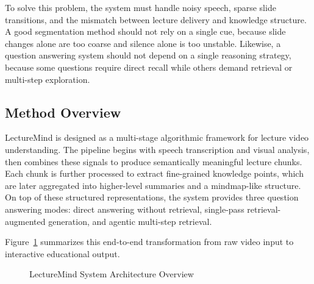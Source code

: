 To solve this problem, the system must handle noisy speech, sparse slide transitions, and the mismatch between lecture delivery and knowledge structure. A good segmentation method should not rely on a single cue, because slide changes alone are too coarse and silence alone is too unstable. Likewise, a question answering system should not depend on a single reasoning strategy, because some questions require direct recall while others demand retrieval or multi-step exploration.

\subsection{Method Overview}

LectureMind is designed as a multi-stage algorithmic framework for lecture video understanding. The pipeline begins with speech transcription and visual analysis, then combines these signals to produce semantically meaningful lecture chunks. Each chunk is further processed to extract fine-grained knowledge points, which are later aggregated into higher-level summaries and a mindmap-like structure. On top of these structured representations, the system provides three question answering modes: direct answering without retrieval, single-pass retrieval-augmented generation, and agentic multi-step retrieval.

Figure~\ref{fig:system-overview} summarizes this end-to-end transformation from raw video input to interactive educational output.

\begin{figure}[H]
    \centering
    \caption{LectureMind System Architecture Overview}
    \label{fig:system-overview}
\end{figure}

